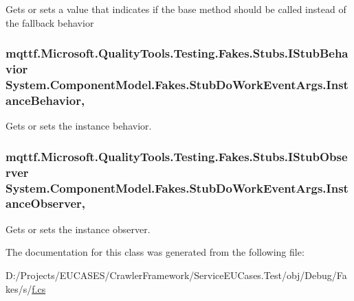 Gets or sets a value that indicates if the base method should be called instead of the fallback behavior

\hypertarget{class_system_1_1_component_model_1_1_fakes_1_1_stub_do_work_event_args_af162bf37274326174ab79b0bb3647a6c}{
\subsubsection[{Instance\-Behavior}]{\setlength{\rightskip}{0pt plus 5cm}mqttf.\-Microsoft.\-Quality\-Tools.\-Testing.\-Fakes.\-Stubs.\-I\-Stub\-Behavior System.\-Component\-Model.\-Fakes.\-Stub\-Do\-Work\-Event\-Args.\-Instance\-Behavior\hspace{0.3cm}{\ttfamily [get]}, {\ttfamily [set]}}}\label{class_system_1_1_component_model_1_1_fakes_1_1_stub_do_work_event_args_af162bf37274326174ab79b0bb3647a6c}


Gets or sets the instance behavior.

\hypertarget{class_system_1_1_component_model_1_1_fakes_1_1_stub_do_work_event_args_ad2e53299162cff3cdae8ca52ec92b924}{
\subsubsection[{Instance\-Observer}]{\setlength{\rightskip}{0pt plus 5cm}mqttf.\-Microsoft.\-Quality\-Tools.\-Testing.\-Fakes.\-Stubs.\-I\-Stub\-Observer System.\-Component\-Model.\-Fakes.\-Stub\-Do\-Work\-Event\-Args.\-Instance\-Observer\hspace{0.3cm}{\ttfamily [get]}, {\ttfamily [set]}}}\label{class_system_1_1_component_model_1_1_fakes_1_1_stub_do_work_event_args_ad2e53299162cff3cdae8ca52ec92b924}


Gets or sets the instance observer.



The documentation for this class was generated from the following file\-:\begin{DoxyCompactItemize}
\item 
D\-:/\-Projects/\-E\-U\-C\-A\-S\-E\-S/\-Crawler\-Framework/\-Service\-E\-U\-Cases.\-Test/obj/\-Debug/\-Fakes/s/\hyperlink{s_2f_8cs}{f.\-cs}\end{DoxyCompactItemize}
